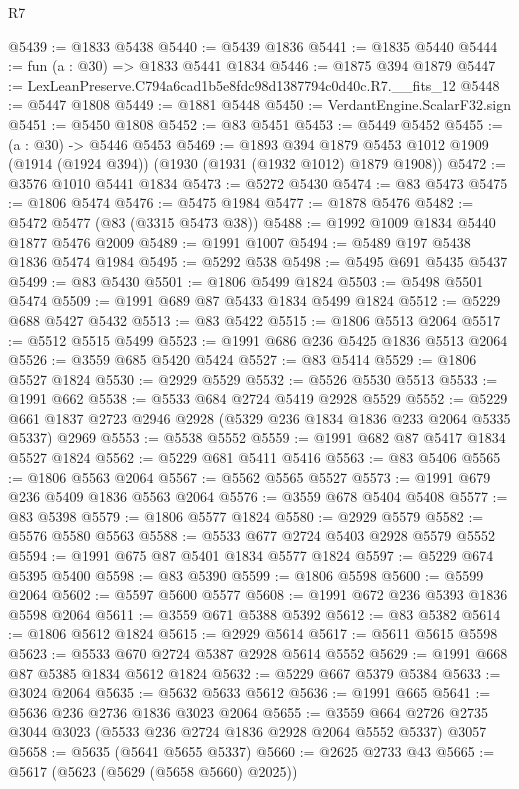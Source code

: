 \begin{lexlean}{R7}
\begin{coremodule}
@5439 := @1833 @5438
@5440 := @5439 @1836
@5441 := @1835 @5440
@5444 := fun (a : @30) => @1833 @5441 @1834
@5446 := @1875 @394 @1879
@5447 := LexLeanPreserve.C794a6cad1b5e8fdc98d1387794c0d40c.R7.__fits_12
@5448 := @5447 @1808
@5449 := @1881 @5448
@5450 := VerdantEngine.ScalarF32.sign
@5451 := @5450 @1808
@5452 := @83 @5451
@5453 := @5449 @5452
@5455 := (a : @30) -> @5446 @5453
@5469 := @1893
    @394
    @1879
    @5453
    @1012
    @1909
    (@1914 (@1924 @394))
    (@1930 (@1931 (@1932 @1012) @1879 @1908))
@5472 := @3576 @1010 @5441 @1834
@5473 := @5272 @5430
@5474 := @83 @5473
@5475 := @1806 @5474
@5476 := @5475 @1984
@5477 := @1878 @5476
@5482 := @5472 @5477 (@83 (@3315 @5473 @38))
@5488 := @1992 @1009 @1834 @5440 @1877 @5476 @2009
@5489 := @1991 @1007
@5494 := @5489 @197 @5438 @1836 @5474 @1984
@5495 := @5292 @538
@5498 := @5495 @691 @5435 @5437
@5499 := @83 @5430
@5501 := @1806 @5499 @1824
@5503 := @5498 @5501 @5474
@5509 := @1991 @689 @87 @5433 @1834 @5499 @1824
@5512 := @5229 @688 @5427 @5432
@5513 := @83 @5422
@5515 := @1806 @5513 @2064
@5517 := @5512 @5515 @5499
@5523 := @1991 @686 @236 @5425 @1836 @5513 @2064
@5526 := @3559 @685 @5420 @5424
@5527 := @83 @5414
@5529 := @1806 @5527 @1824
@5530 := @2929 @5529
@5532 := @5526 @5530 @5513
@5533 := @1991 @662
@5538 := @5533 @684 @2724 @5419 @2928 @5529
@5552 := @5229 @661 @1837 @2723 @2946 @2928 (@5329 @236 @1834 @1836 @233 @2064 @5335 @5337) @2969
@5553 := @5538 @5552
@5559 := @1991 @682 @87 @5417 @1834 @5527 @1824
@5562 := @5229 @681 @5411 @5416
@5563 := @83 @5406
@5565 := @1806 @5563 @2064
@5567 := @5562 @5565 @5527
@5573 := @1991 @679 @236 @5409 @1836 @5563 @2064
@5576 := @3559 @678 @5404 @5408
@5577 := @83 @5398
@5579 := @1806 @5577 @1824
@5580 := @2929 @5579
@5582 := @5576 @5580 @5563
@5588 := @5533 @677 @2724 @5403 @2928 @5579 @5552
@5594 := @1991 @675 @87 @5401 @1834 @5577 @1824
@5597 := @5229 @674 @5395 @5400
@5598 := @83 @5390
@5599 := @1806 @5598
@5600 := @5599 @2064
@5602 := @5597 @5600 @5577
@5608 := @1991 @672 @236 @5393 @1836 @5598 @2064
@5611 := @3559 @671 @5388 @5392
@5612 := @83 @5382
@5614 := @1806 @5612 @1824
@5615 := @2929 @5614
@5617 := @5611 @5615 @5598
@5623 := @5533 @670 @2724 @5387 @2928 @5614 @5552
@5629 := @1991 @668 @87 @5385 @1834 @5612 @1824
@5632 := @5229 @667 @5379 @5384
@5633 := @3024 @2064
@5635 := @5632 @5633 @5612
@5636 := @1991 @665
@5641 := @5636 @236 @2736 @1836 @3023 @2064
@5655 := @3559 @664 @2726 @2735 @3044 @3023 (@5533 @236 @2724 @1836 @2928 @2064 @5552 @5337) @3057
@5658 := @5635 (@5641 @5655 @5337)
@5660 := @2625 @2733 @43
@5665 := @5617 (@5623 (@5629 (@5658 @5660) @2025))

\end{coremodule}
\end{lexlean}
